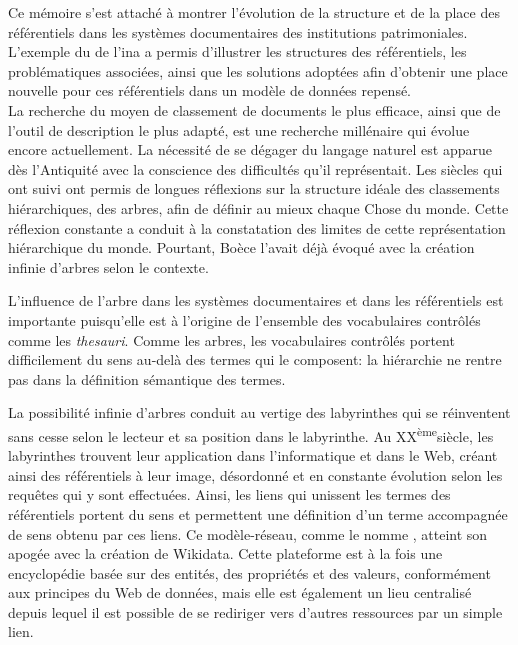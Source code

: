 
Ce mémoire s'est attaché à montrer l'évolution de la structure et de la place des référentiels dans les systèmes documentaires des institutions patrimoniales. L'exemple du \ldd de l'\ac*{ina} a permis d'illustrer les structures des référentiels, les problématiques associées, ainsi que les solutions adoptées afin d'obtenir une place nouvelle pour ces référentiels dans un modèle de données repensé.\\

La recherche du moyen de classement de documents le plus efficace, ainsi que de l'outil de description le plus adapté, est une recherche millénaire qui évolue encore actuellement. La nécessité de se dégager du langage naturel est apparue dès l'Antiquité avec la conscience des difficultés qu'il représentait. Les siècles qui ont suivi ont permis de longues réflexions sur la structure idéale des classements hiérarchiques, des arbres, afin de définir au mieux chaque Chose du monde. Cette réflexion constante a conduit à la constatation des limites de cette représentation hiérarchique du monde. Pourtant, Boèce l'avait déjà évoqué avec la création infinie d'arbres selon le contexte.

\noindent L'influence de l'arbre dans les systèmes documentaires et dans les référentiels est importante puisqu'elle est à l'origine de l'ensemble des vocabulaires contrôlés comme les \textit{thesauri}. Comme les arbres, les vocabulaires contrôlés portent difficilement du sens au-delà des termes qui le composent: la hiérarchie ne rentre pas dans la définition sémantique des termes.

\noindent La possibilité infinie d'arbres conduit au vertige des labyrinthes qui se réinventent sans cesse selon le lecteur et sa position dans le labyrinthe. Au \textsc{XX}\textsuperscript{ème}siècle, les labyrinthes trouvent leur application dans l'informatique et dans le Web, créant ainsi des référentiels à leur image, désordonné et en constante évolution selon les requêtes qui y sont effectuées. Ainsi, les liens qui unissent les termes des référentiels portent du sens et permettent une définition d'un terme accompagnée de sens obtenu par ces liens. Ce \og modèle-réseau\fg{}, comme le nomme , atteint son apogée avec la création de Wikidata. Cette plateforme est à la fois une encyclopédie basée sur des entités, des propriétés et des valeurs, conformément aux principes du Web de données, mais elle est également un lieu centralisé depuis lequel il est possible de se rediriger vers d'autres ressources par un simple lien.

